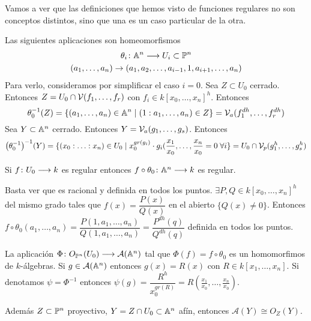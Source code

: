 \documentclass[ACGA.tex]{subfiles}
\begin{document}
\begin{prop}Vamos a ver que las definiciones que hemos visto de funciones regulares no son conceptos distintos, sino que una es un caso particular de la otra.
\end{prop}
\begin{dem}
\begin{lemma}
 Las siguientes aplicaciones son homeomorfismos
\begin{gather*} 
\theta_i \colon{\mathbb{A}^n}\longrightarrow{U_i\subset \mathbb{P}^n}\\
(a_1,\dotsc,a_n) \rightarrow (a_1,a_2,\dotsc,a_{i-1},1,a_{i+1},\dotsc,a_n)
\end{gather*}
Para verlo, consideramos por simplificar el caso $i=0$. Sea $Z\subset U_0$ cerrado. Entonces $Z=U_0\cap \mathcal{V}(f_1,\dotsc,f_r)$ con $f_i \in k[x_0,\dotsc,x_n]^h$. Entonces
$$
\theta_0^{-1}(Z) = \{(a_1,\dotsc,a_n)\in\mathbb{A}^n \mid (1:a_1,\dotsc,a_n)\in Z\} = \mathcal{V}_{a}(f_1^{dh},\dotsc,f_r^{dh})
$$
Sea $Y\subset \mathbb{A}^n$ cerrado. Entonces $Y=\mathcal{V}_{a}(g_1,\dotsc,g_s)$. Entonces
$$
{\left(\theta_0^{-1}\right)}^{-1}(Y) = \{(x_0:\dotsc:x_n)\in U_0 \mid x_0^{gr(g_i)}\cdot g_i(\frac{x_1}{x_0},\dotsc,\frac{x_n}{x_0}=0\;\forall i\} = U_0 \cap \mathcal{V}_{p}(g_1^h,\dotsc,g_s^h)
$$
\end{lemma}
\begin{lemma}Si $f\colon{U_0}\longrightarrow{k}$ es regular entonces $f \circ \theta_0\colon{\mathbb{A}^n}\longrightarrow{k}$ es regular. 

Basta ver que es racional y definida en todos los puntos. $\exists P,Q\in k[x_0,\dotsc,x_n]^h$ del mismo grado tales que $f(x)=\dfrac{P(x)}{Q(x)}$ en el abierto $\{Q(x)\neq 0\}$. Entonces $f\circ \theta_0 (a_1,\dotsc,a_n)= \dfrac{P(1,a_1,\dotsc,a_n)}{Q(1,a_1,\dotsc,a_n)} = \dfrac{P^{dh}(q)}{Q^{dh}(q)}$ definida en todos los puntos. 
\end{lemma}
La aplicación $\Phi \colon{ O_{\mathbb{P}^n}(U_0)}\longrightarrow{\mathcal{A}(\mathbb{A}^n)}$ tal que $\Phi(f) = f\circ \theta_0$ es un homomorfimos de $k$-álgebras. Si $g\in\mathcal{A}(\mathbb{A}^n)$ entonces $g(x)=R(x)$ con $R\in k[x_1,\dotsc,x_n]$. Si denotamos $\psi = \Phi^{-1}$ entonces $\psi(g) = \dfrac{R^h}{x_0^{gr(R)}}=R(\frac{x_1}{x_0},\dotsc,\frac{x_n}{x_0})$.

Además $Z\subset \mathbb{P}^n$ proyectivo, $Y=Z\cap U_0 \subset \mathbb{A}^n$ afín, entonces $\mathcal{A}(Y)\cong O_Z(Y)$.
\end{dem}
\end{document}
